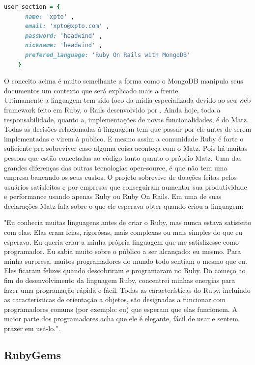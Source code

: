 {\singlespace
\begin{lstlisting}[caption=Exemplo de um \textit{Ruby Hash},language=Ruby,label={ruby-hash}]
    user_section = {
      name: 'xpto' ,
      email: 'xpto@xpto.com' ,
      password: 'headwind' ,
      nickname: 'headwind' ,
      prefered_language: 'Ruby On Rails with MongoDB'
    }
\end{lstlisting}
}

O conceito acima é muito semelhante a forma como o MongoDB manipula seus documentos um contexto que será explicado mais a frente.
\\

Ultimamente a linguagem tem sido foco da mídia especializada devido ao seu web framework feito em Ruby, o Rails desenvolvido por \cite{DAVIDHANSSON}. Ainda hoje, toda a responsabilidade, quanto a, implementações de novas funcionalidades, é do Matz. Todas as decisões relacionadas à linguagem tem que passar por ele antes de serem implementadas e virem à publico. E mesmo assim a comunidade Ruby é forte o suficiente pra sobreviver caso alguma coisa aconteça com o Matz. Pois  há muitas pessoas que estão conectadas ao código tanto quanto o próprio Matz. Uma das grandes diferenças das outras tecnologias open-source, é que não tem uma empresa bancando os seus custos. O projeto sobrevive de doações feitas pelos usuários satisfeitos e por empresas que conseguiram aumentar sua produtividade e performance usando apenas Ruby ou Ruby On Rails. Em uma de suas declarações Matz fala sobre o que ele esperava obter quando criou a linguagem:

"Eu conhecia muitas linguagens antes de criar o Ruby, mas nunca estava satisfeito com elas. Elas eram feias, rigorósas, mais complexas ou mais simples do que eu esperava. Eu queria criar a minha própria linguagem que me satisfizesse como programador. Eu sabia muito sobre o público a ser alcançado: eu mesmo. Para minha surpresa, muitos programadores do mundo todo sentiam o mesmo que eu. Eles ficaram felizes quando descobriram e programaram no Ruby. Do começo ao fim do desenvolvimento da linguagem Ruby, concentrei minhas energias para fazer uma programação rápida e fácil. Todas as características do Ruby, incluindo as características de orientação a objetos, são designadas a funcionar com programadores comuns (por exemplo: eu) que esperam que elas funcionem. A maior parte dos programadores acha que ele é elegante, fácil de usar e sentem prazer em usá-lo."\cite{MATZ}.

\subsection{RubyGems}
\label{Ruby}

